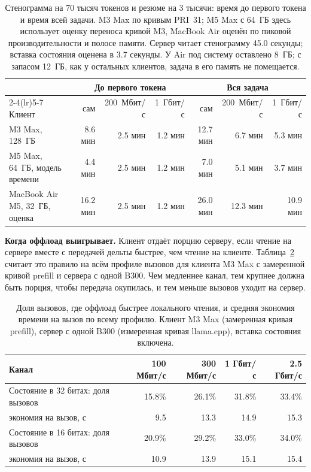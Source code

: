 \begin{table}[t]
\centering
\caption{Стенограмма на 70 тысяч токенов и резюме на 3 тысячи: время до первого токена и время всей задачи. M3 Max
по кривым PRI~31; M5 Max с 64~ГБ здесь использует оценку переноса кривой M3, MacBook Air оценён по пиковой производительности и полосе памяти. Сервер читает
стенограмму 45.0 секунды; вставка состояния оценена в 3.7 секунды. У Air под систему оставлено 8~ГБ; с запасом 12~ГБ, как у остальных клиентов, задача в его
память не помещается.}
\label{tab:transcript}
\footnotesize
\begin{tabular}{lrrrrrr}
\toprule
 & \multicolumn{3}{c}{До первого токена} & \multicolumn{3}{c}{Вся задача} \\
\cmidrule(lr){2-4}\cmidrule(lr){5-7}
Клиент & сам & 200~Мбит/с & 1~Гбит/с & сам & 200~Мбит/с & 1~Гбит/с \\
\midrule
M3 Max, 128~ГБ & 8.6 мин & 2.5 мин & 1.2 мин & 12.7 мин & 6.7 мин & 5.3 мин \\
M5 Max, 64~ГБ, модель времени & 4.4 мин & 2.5 мин & 1.2 мин & 7.0 мин & 5.1 мин & 3.7 мин \\
MacBook Air M5, 32~ГБ, оценка & 16.2 мин & 2.5 мин & 1.2 мин & 26.0 мин & 12.3 мин & 10.9 мин \\
\bottomrule
\end{tabular}
\end{table}

\textbf{Когда оффлоад выигрывает.} Клиент отдаёт порцию серверу, если чтение на сервере вместе с передачей дельты
быстрее, чем чтение на клиенте. Таблица~\ref{tab:offload} считает это правило на всём профиле вызовов для клиента M3
Max с замеренной кривой prefill и сервера с одной B300. Чем медленнее канал, тем крупнее должна быть порция, чтобы
передача окупилась, и тем меньше вызовов уходит на сервер.

\begin{table}[t]
\centering
\caption{Доля вызовов, где оффлоад быстрее локального чтения, и средняя экономия времени на вызов по всему профилю.
Клиент M3 Max (замеренная кривая prefill), сервер с одной B300 (измеренная кривая llama.cpp), вставка состояния включена.}
\label{tab:offload}
\footnotesize
\begin{tabular}{lrrrr}
\toprule
Канал & 100 Мбит/с & 300 Мбит/с & 1 Гбит/с & 2.5 Гбит/с \\
\midrule
Состояние в 32 битах: доля вызовов & 15.8\% & 26.1\% & 31.8\% & 33.4\% \\
\quad экономия на вызов, с & 9.5 & 13.3 & 14.9 & 15.3 \\
Состояние в 16 битах: доля вызовов & 20.9\% & 29.2\% & 33.0\% & 34.0\% \\
\quad экономия на вызов, с & 10.9 & 13.9 & 15.1 & 15.4 \\
\bottomrule
\end{tabular}
\end{table}

